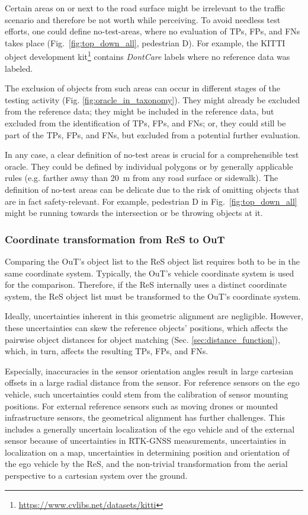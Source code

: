 \documentclass[conference]{IEEEtran}
\begin{document}
Certain areas on or next to the road surface might be irrelevant to the traffic scenario and therefore be not worth while perceiving. 
To avoid needless test efforts, one could define no-test-areas, where no evaluation of TPs, FPs, and FNs takes place (Fig.~\ref{fig:top_down_all}, pedestrian D). 
For example, the KITTI object development kit\footnote{\url{https://www.cvlibs.net/datasets/kitti}} contains \textit{DontCare} labels where no reference data was labeled. 

The exclusion of objects from such areas can occur in different stages of the testing activity (Fig. \ref{fig:oracle_in_taxonomy}). 
They might already be excluded from the reference data; they might be included in the reference data, but excluded from the identification of TPs, FPs, and FNs; or, they could still be part of the TPs, FPs, and FNs, but excluded from a potential further evaluation.

In any case, a clear definition of no-test areas is crucial for a comprehensible test oracle. 
They could be defined by individual polygons or by generally applicable rules (e.g. farther away than \SI{20}{\meter} from any road surface or sidewalk).
The definition of no-test areas can be delicate due to the risk of omitting objects that are in fact safety-relevant. 
For example, pedestrian D in Fig.~\ref{fig:top_down_all} might be running towards the intersection or be throwing objects at it.

\subsubsection{Coordinate transformation from ReS to OuT}
\label{sec:geometrical_alignment}

Comparing the OuT's object list to the ReS object list requires both to be in the same coordinate system. 
Typically, the OuT's vehicle coordinate system is used for the comparison. 
Therefore, if the ReS internally uses a distinct coordinate system, the ReS object list must be transformed to the OuT's coordinate system. 

Ideally, uncertainties inherent in this geometric alignment are negligible. 
However, these uncertainties can skew the reference objects' positions, which affects the pairwise object distances for object matching (Sec. \ref{sec:distance_function}), which, in turn, affects the resulting TPs, FPs, and FNs.  
 
Especially, inaccuracies in the sensor orientation angles result in large cartesian offsets in a large radial distance from the sensor.
For reference sensors on the ego vehicle, such uncertainties could stem from the calibration of sensor mounting positions. 
For external reference sensors such as moving drones or mounted infrastructure sensors, the geometrical alignment has further challenges. %
This includes a generally uncertain localization of the ego vehicle and of the external sensor because of uncertainties in RTK-GNSS measurements, uncertainties in localization on a map, uncertainties in determining position and orientation of the ego vehicle by the ReS, and the non-trivial transformation from the aerial perspective to a cartesian system over the ground. 
\end{document}
